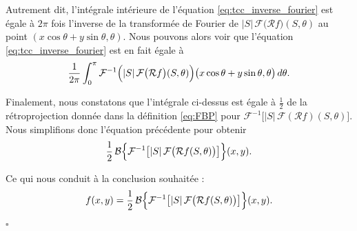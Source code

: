 Autrement dit, l'intégrale intérieure de l'équation \eqref{eq:tcc_inverse_fourier} est égale à $2\pi$ fois l'inverse de la transformée de Fourier de
$|S|\,\mathcal{F}\bigl(\mathcal{R}f\bigr)(S,\theta)$
au point $(x\cos\theta + y\sin\theta,\theta)$.
Nous pouvons alors voir que l'équation \eqref{eq:tcc_inverse_fourier} est en fait égale à
\begin{equation}
\frac{1}{2\pi} \int_{0}^{\pi}
\mathcal{F}^{-1}
\Bigl(
|S|\,\mathcal{F}\bigl(\mathcal{R}f\bigr)(S,\theta)
\Bigr)
\bigl(x\cos\theta + y\sin\theta,\theta\bigr)
\,d\theta.
\end{equation}

Finalement, nous constatons que l'intégrale ci-dessus est égale à $\tfrac{1}{2}$ de la rétroprojection donnée dans la définition \eqref{eq:FBP} pour
$\mathcal{F}^{-1}\bigl[|S|\,\mathcal{F}(\mathcal{R}f)(S,\theta)\bigr]$.
Nous simplifions donc l'équation précédente pour obtenir
\begin{equation}
\frac{1}{2}\,
\mathcal{B}
\Bigl\{
\mathcal{F}^{-1}
\bigl[|S|\,\mathcal{F}\bigl(\mathcal{R}f(S,\theta)\bigr)\bigr]
\Bigr\}(x,y).
\end{equation}

Ce qui nous conduit à la conclusion souhaitée :
\begin{equation}
f(x,y)
=
\frac{1}{2}\,
\mathcal{B}
\Bigl\{
\mathcal{F}^{-1}
\bigl[|S|\,\mathcal{F}\bigl(\mathcal{R}f(S,\theta)\bigr)\bigr]
\Bigr\}(x,y).
\end{equation}
\hfill $\square$

